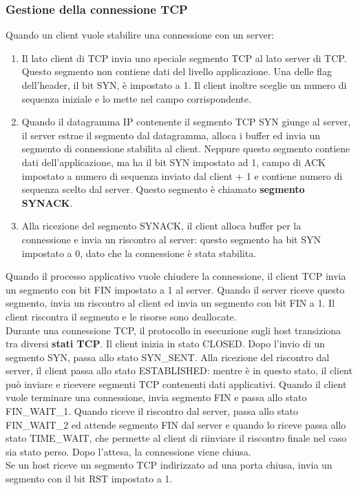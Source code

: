 \documentclass[11pt]{article}
\begin{document}
\subsubsection{Gestione della connessione TCP}
Quando un client vuole stabilire una connessione con un server:
\begin{enumerate}
    \item Il lato client di TCP invia uno speciale segmento TCP al lato server di TCP. Questo segmento non contiene dati 
    del livello applicazione. Una delle flag dell'header, il bit SYN, è impostato a 1. Il client inoltre sceglie un 
    numero di sequenza iniziale e lo mette nel campo corrispondente.
    \item Quando il datagramma IP contenente il segmento TCP SYN giunge al server, il server estrae il segmento dal 
    datagramma, alloca i buffer ed invia un segmento di connessione stabilita al client. Neppure questo segmento contiene 
    dati dell'applicazione, ma ha il bit SYN impostato ad 1, campo di ACK impostato a numero di sequenza inviato dal 
    client + 1 e contiene numero di sequenza scelto dal server. Questo segmento è chiamato \textbf{segmento SYNACK}.
    \item Alla ricezione del segmento SYNACK, il client alloca buffer per la connessione e invia un riscontro al server: 
    questo segmento ha bit SYN impostato a 0, dato che la connessione è stata stabilita.
\end{enumerate}
Quando il processo applicativo vuole chiudere la connessione, il client TCP invia un segmento con bit FIN impostato a 1 
al server. Quando il server riceve questo segmento, invia un riscontro al client ed invia un segmento con bit FIN a 1. Il 
client riscontra il segmento e le risorse sono deallocate.\\
Durante una connessione TCP, il protocollo in esecuzione sugli host transiziona tra diversi \textbf{stati TCP}. Il client 
inizia in stato CLOSED. Dopo l'invio di un segmento SYN, passa allo stato SYN\_SENT. Alla ricezione del riscontro dal 
server, il client passa allo stato ESTABLISHED: mentre è in questo stato, il client può inviare e ricevere segmenti TCP 
contenenti dati applicativi. Quando il client vuole terminare una connessione, invia segmento FIN e passa allo stato 
FIN\_WAIT\_1. Quando riceve il riscontro dal server, passa allo stato FIN\_WAIT\_2 ed attende segmento FIN dal server e 
quando lo riceve passa allo stato TIME\_WAIT, che permette al client di riinviare il riscontro finale nel caso sia stato 
perso. Dopo l'attesa, la connessione viene chiusa.\\
Se un host riceve un segmento TCP indirizzato ad una porta chiusa, invia un segmento con il bit RST impostato a 1.
\end{document}
